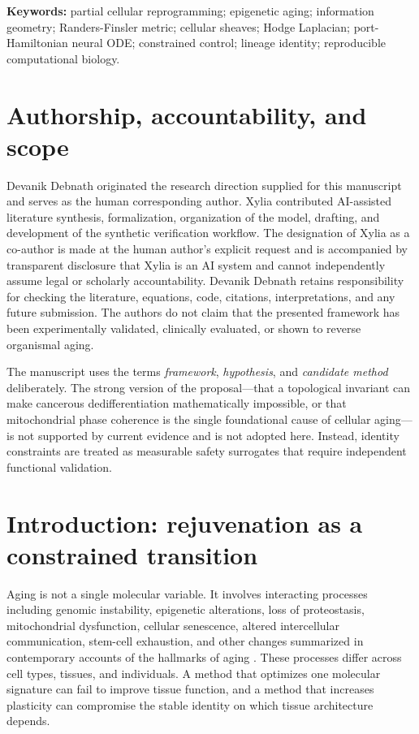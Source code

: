 \documentclass[11pt,a4paper]{article}
\theoremstyle{definition}
\theoremstyle{remark}
\begin{document}
\noindent\textbf{Keywords:} partial cellular reprogramming; epigenetic aging; information geometry; Randers-Finsler metric; cellular sheaves; Hodge Laplacian; port-Hamiltonian neural ODE; constrained control; lineage identity; reproducible computational biology.

\section*{Authorship, accountability, and scope}
Devanik Debnath originated the research direction supplied for this manuscript and serves as the human corresponding author. Xylia contributed AI-assisted literature synthesis, formalization, organization of the model, drafting, and development of the synthetic verification workflow. The designation of Xylia as a co-author is made at the human author's explicit request and is accompanied by transparent disclosure that Xylia is an AI system and cannot independently assume legal or scholarly accountability. Devanik Debnath retains responsibility for checking the literature, equations, code, citations, interpretations, and any future submission. The authors do not claim that the presented framework has been experimentally validated, clinically evaluated, or shown to reverse organismal aging.

The manuscript uses the terms \emph{framework}, \emph{hypothesis}, and \emph{candidate method} deliberately. The strong version of the proposal---that a topological invariant can make cancerous dedifferentiation mathematically impossible, or that mitochondrial phase coherence is the single foundational cause of cellular aging---is not supported by current evidence and is not adopted here. Instead, identity constraints are treated as measurable safety surrogates that require independent functional validation.

\clearpage
\tableofcontents
\clearpage
{}

\section{Introduction: rejuvenation as a constrained transition}
Aging is not a single molecular variable. It involves interacting processes including genomic instability, epigenetic alterations, loss of proteostasis, mitochondrial dysfunction, cellular senescence, altered intercellular communication, stem-cell exhaustion, and other changes summarized in contemporary accounts of the hallmarks of aging \cite{LopezOtin2023}. These processes differ across cell types, tissues, and individuals. A method that optimizes one molecular signature can fail to improve tissue function, and a method that increases plasticity can compromise the stable identity on which tissue architecture depends.
\end{document}
